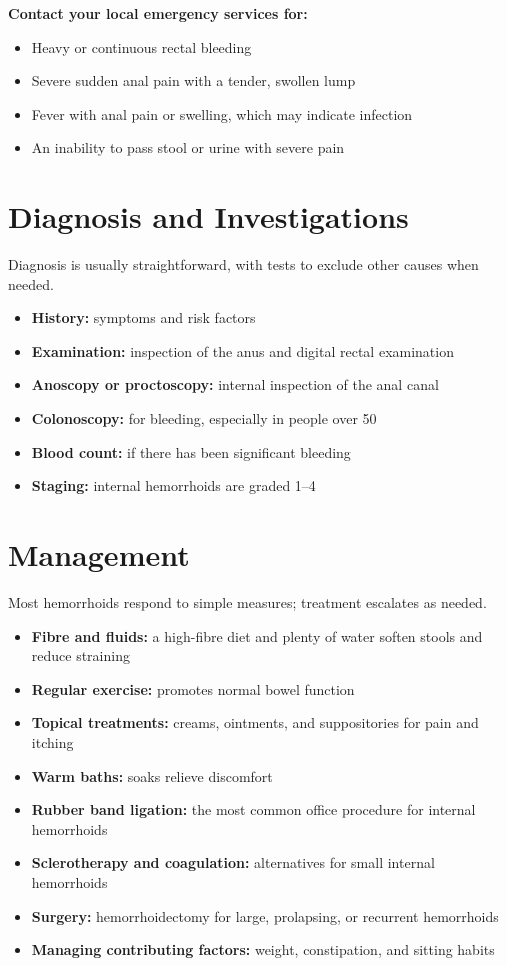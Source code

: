 \textbf{Contact your local emergency services for:}
\begin{itemize}
    \item Heavy or continuous rectal bleeding
    \item Severe sudden anal pain with a tender, swollen lump
    \item Fever with anal pain or swelling, which may indicate infection
    \item An inability to pass stool or urine with severe pain
\end{itemize}

\section*{Diagnosis and Investigations}
Diagnosis is usually straightforward, with tests to exclude other causes when needed.

\begin{itemize}
    \item \textbf{History:} symptoms and risk factors
    \item \textbf{Examination:} inspection of the anus and digital rectal examination
    \item \textbf{Anoscopy or proctoscopy:} internal inspection of the anal canal
    \item \textbf{Colonoscopy:} for bleeding, especially in people over 50
    \item \textbf{Blood count:} if there has been significant bleeding
    \item \textbf{Staging:} internal hemorrhoids are graded 1--4
\end{itemize}

\section*{Management}
Most hemorrhoids respond to simple measures; treatment escalates as needed.

\begin{itemize}
    \item \textbf{Fibre and fluids:} a high-fibre diet and plenty of water soften stools and reduce straining
    \item \textbf{Regular exercise:} promotes normal bowel function
    \item \textbf{Topical treatments:} creams, ointments, and suppositories for pain and itching
    \item \textbf{Warm baths:} soaks relieve discomfort
    \item \textbf{Rubber band ligation:} the most common office procedure for internal hemorrhoids
    \item \textbf{Sclerotherapy and coagulation:} alternatives for small internal hemorrhoids
    \item \textbf{Surgery:} hemorrhoidectomy for large, prolapsing, or recurrent hemorrhoids
    \item \textbf{Managing contributing factors:} weight, constipation, and sitting habits
\end{itemize}

